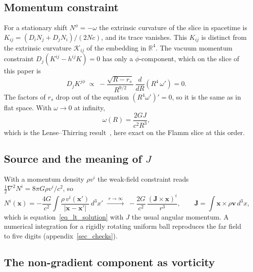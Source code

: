 \documentclass[pdflatex,sn-mathphys-num]{sn-jnl}%
\theoremstyle{thmstyleone}%
\theoremstyle{thmstyletwo}%
\theoremstyle{thmstylethree}%
\begin{document}
\subsection{Momentum constraint}

For a stationary shift $N^\phi=-\omega$ the extrinsic curvature of the slice in spacetime is $K_{ij}=\left(D_iN_j+D_jN_i\right)/(2Nc)$, and its trace vanishes. This $K_{ij}$ is distinct from the extrinsic curvature $\mathcal{K}_{ij}$ of the embedding in $\mathbb{R}^4$. The vacuum momentum constraint $D_j\!\left(K^{ij}-h^{ij}K\right)=0$ has only a $\phi$-component, which on the slice of this paper is
\begin{equation}\label{eq_momentum_vacuum}
    D_jK^{j\phi}\;\propto\;-\frac{\sqrt{R-r_s}}{R^{9/2}}\,\frac{d}{dR}\!\left(R^4\,\omega'\right)=0 .
\end{equation}
The factors of $r_s$ drop out of the equation $\left(R^4\omega'\right)'=0$, so it is the same as in flat space. With $\omega\to0$ at infinity,
\begin{equation}\label{eq_lt_solution}
    \omega(R)=\frac{2GJ}{c^2R^3},
\end{equation}
which is the Lense--Thirring result~\cite{LenseThirring1918}, here exact on the Flamm slice at this order.

\subsection{Source and the meaning of $J$}

With a momentum density $\rho v^i$ the weak-field constraint reads $\tfrac12\nabla^2N^i=8\pi G\rho v^i/c^2$, so
\begin{equation}\label{eq_shift_poisson}
    N^i(\mathbf{x})=-\frac{4G}{c^2}\int\frac{\rho\,v^i(\mathbf{x}')}{|\mathbf{x}-\mathbf{x}'|}\,d^3x'
    \;\xrightarrow{\;r\to\infty\;}\;
    -\frac{2G}{c^2}\,\frac{(\mathbf{J}\times\mathbf{x})^i}{r^3},
    \qquad
    \mathbf{J}=\int\mathbf{x}\times\rho\mathbf{v}\,d^3x ,
\end{equation}
which is equation~\eqref{eq_lt_solution} with $J$ the usual angular momentum. A numerical integration for a rigidly rotating uniform ball reproduces the far field to five digits (appendix~\ref{sec_checks}).

\subsection{The non-gradient component as vorticity}
\end{document}
